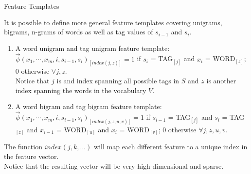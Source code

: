 \documentclass[handout]{beamer}
\begin{document}
\begin{frame}{Feature Templates}
\begin{scriptsize}

It is possible to define more general feature templates covering unigrams, bigrams, n-grams of words as well as tag values of $s_{i-1}$ and $s_i$.

\begin{enumerate}
  
 \item A word unigram and tag unigram feature template: $\vec{\phi}(x_1, \cdots, x_m, i, s_{i-1},s_i)_{[index(j,z)]}=1$ if $s_i$ = TAG$_{[j]}$ and $x_i$ = WORD$_{[z]}$; 0 otherwise $\forall j,z$. \\ Notice that $j$ is and index spanning all possible tags in $S$ and $z$ is another index spanning the words in the vocabulary $V$.
 
 \item A word bigram and tag bigram feature template: $\vec{\phi}(x_1, \cdots, x_m, i, s_{i-1},s_i)_{[index(j,z,u,v)]}=1$ if $s_{i-1}$ = TAG$_{[j]}$ and $s_i$ = TAG$_{[z]}$ and $x_{i-1}$ = WORD$_{[u]}$ and $x_{i}$ = WORD$_{[v]}$; 0 otherwise $\forall j,z,u,v$. 
 
 
\end{enumerate}

The function $index(j,k,...)$ will map each different feature to a unique index in the feature vector.  \\
Notice that the resulting vector will be very high-dimensional and sparse.
\end{scriptsize}
\end{frame}
\end{document}
